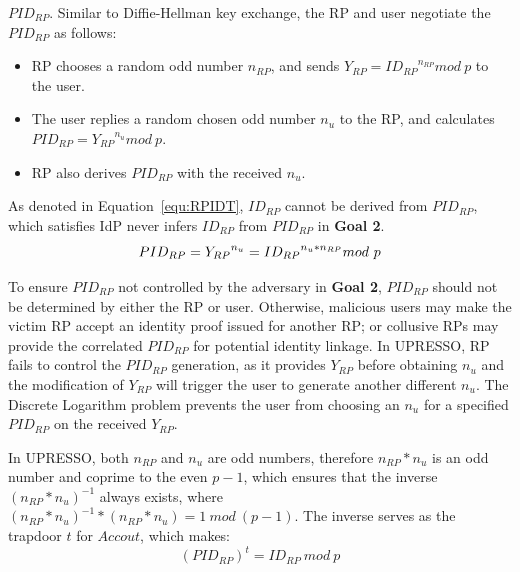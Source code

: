 \noindent\textbf{$PID_{RP}$}. Similar to Diffie-Hellman key exchange\cite{DiffieH76}, the RP and user negotiate the  $PID_{RP}$ as follows:
\begin{itemize}
  \item RP chooses a random odd number $n_{RP}$, and sends $Y_{RP} = {ID_{RP}}^{n_{RP}} mod \ p$ to the user.
  \item The user replies a random chosen odd number $n_{u}$ to the RP, and calculates $PID_{RP} = {Y_{RP}}^{n_{u}} mod \ p$.
  \item RP also derives $PID_{RP}$ with the received $n_{u}$.
\end{itemize}

As denoted in Equation~\ref{equ:RPIDT}, ${ID_{RP}}$ cannot be derived from $PID_{RP}$, which satisfies IdP never infers ${ID_{RP}}$ from $PID_{RP}$ in \textbf{Goal 2}.
   \begin{equation}
   PID_{RP} = {Y_{RP}}^{n_{u}} = {ID_{RP}}^{n_{u}* n_{RP}} mod \ p
   \label{equ:ID_{RP}T}
   \end{equation}

To ensure $PID_{RP}$ not controlled by the adversary in \textbf{Goal 2},
 $PID_{RP}$ should not be determined by  either the RP or user. %
Otherwise, malicious users may make the victim RP accept an identity proof issued for another RP; or collusive RPs may provide the correlated $PID_{RP}$ for potential identity linkage.
In UPRESSO, RP fails to control the $PID_{RP}$ generation, as it provides $Y_{RP}$ before obtaining $n_{u}$ and the modification of $Y_{RP}$ will trigger the user to generate another different  $n_{u}$. The Discrete Logarithm problem prevents the user from choosing an $n_{u}$ for a specified $PID_{RP}$ on the received $Y_{RP}$.

In UPRESSO, both $n_{RP}$ and $n_{u}$ are odd numbers, therefore $n_{RP}*n_{u}$ is an odd number and coprime to the even $p-1$, which ensures that the inverse $(n_{RP}*n_{u})^{-1}$ always exists, where  $(n_{RP}*n_{u})^{-1} * (n_{RP}*n_{u}) = 1 \ mod \ (p-1)$. The inverse  serves as  the trapdoor $t$ for $Accout$, which makes:
\begin{equation}
(PID_{RP})^t = ID_{RP} \ mod \ p
\label{equ:trapdoor}
\end{equation}


